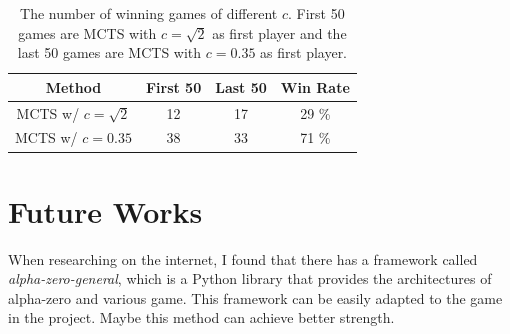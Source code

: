 \documentclass[twocolumn]{extarticle}
\begin{document}
\begin{table}[H]
\centering
\caption{The number of winning games of different $c$. First 50 games are MCTS with $c=\sqrt{2}$ as first player and the last 50 games are MCTS with $c=0.35$ as first player.}
\label{tab:c}
\begin{tabular}{@{}cccc@{}}
\toprule
\textbf{Method}   & \textbf{First 50} & \textbf{Last 50} & \textbf{Win Rate} \\ \midrule
MCTS w/ $c=\sqrt{2}$ & 12                & 17               & 29 \%\\
MCTS w/ $c=0.35$            & 38                 & 33                & 71 \% \\ \bottomrule
\end{tabular}
\end{table}

\section{Future Works}

When researching on the internet, I found that there has a framework called \textit{alpha-zero-general}, which is a Python library that provides the architectures of alpha-zero and various game. This framework can be easily adapted to the game in the project. Maybe this method can achieve better strength.


\printbibliography
\end{document}
